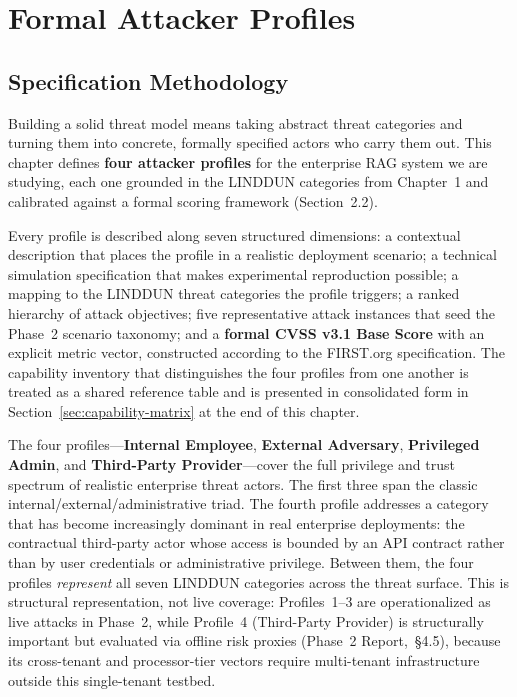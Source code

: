 \documentclass[a4paper,12pt]{report}
\begin{document}
\chapter{Formal Attacker Profiles}

\section{Specification Methodology}

Building a solid threat model means taking abstract threat categories and
turning them into concrete, formally specified actors who carry them out.
This chapter defines \textbf{four attacker profiles} for the enterprise RAG
system we are studying, each one grounded in the LINDDUN categories from
Chapter~1 and calibrated against a formal scoring framework (Section~2.2).

Every profile is described along seven structured dimensions: a contextual
description that places the profile in a realistic deployment scenario; a
technical simulation specification that makes experimental reproduction
possible; a mapping to the LINDDUN threat categories the profile triggers;
a ranked hierarchy of attack objectives; five representative attack
instances that seed the Phase~2 scenario taxonomy; and a \textbf{formal
CVSS v3.1 Base Score} with an explicit metric vector, constructed according
to the FIRST.org specification. The capability inventory that distinguishes
the four profiles from one another is treated as a shared reference table
and is presented in consolidated form in Section~\ref{sec:capability-matrix}
at the end of this chapter.

The four profiles---\textbf{Internal Employee}, \textbf{External Adversary},
\textbf{Privileged Admin}, and \textbf{Third-Party Provider}---cover the
full privilege and trust spectrum of realistic enterprise threat actors.
The first three span the classic internal/external/administrative triad.
The fourth profile addresses a category that has become increasingly
dominant in real enterprise deployments: the contractual third-party
actor whose access is bounded by an API contract rather than by user
credentials or administrative privilege. Between them, the four profiles
\emph{represent} all seven LINDDUN categories across the threat surface.
This is structural representation, not live coverage: Profiles~1--3 are
operationalized as live attacks in Phase~2, while Profile~4 (Third-Party
Provider) is structurally important but evaluated via offline risk proxies
(Phase~2 Report,~\S4.5), because its cross-tenant and processor-tier vectors
require multi-tenant infrastructure outside this single-tenant testbed.
\end{document}
